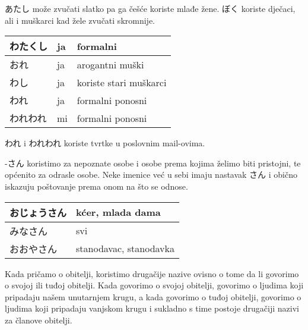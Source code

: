 	\vspace{10pt}
	
	あたし može zvučati slatko pa ga češće koriste mlađe žene. ぼく koriste dječaci, ali i muškarci kad žele zvučati skromnije.
	
	
	\vspace{10pt}
	
	\begin{tabular}{|l|l|l|}
		\hline
		わたくし&ja&formalni\\\hline
		おれ&ja&arogantni muški\\\hline
		わし&ja&koriste stari muškarci\\\hline
		われ&ja&formalni ponosni\\\hline
		われわれ&mi&formalni ponosni\\\hline
	\end{tabular}

	\vspace{10pt}	
	
	われ i われわれ koriste tvrtke u poslovnim mail-ovima.
	
	
	\ten {}

	\vspace{10pt}

	-さん	koristimo za nepoznate osobe i osobe prema kojima želimo biti pristojni, te općenito za odrasle osobe. Neke imenice već u sebi imaju nastavak さん i obično iskazuju poštovanje prema onom na što se odnose.
	
	
	\vspace{10pt}	
	
	\begin{tabular}{|l|l|}
		\hline
		おじょうさん&kćer, mlada dama\\\hline
		みなさん&svi\\\hline
		おおやさん&stanodavac, stanodavka\\\hline

	\end{tabular}
	
	\vspace{10pt}
	
	Kada pričamo o obitelji, koristimo drugačije nazive ovisno o tome da li govorimo o svojoj ili tuđoj obitelji. Kada govorimo o svojoj obitelji, govorimo o ljudima koji pripadaju našem unutarnjem krugu, a kada govorimo o tuđoj obitelji, govorimo o ljudima koji pripadaju vanjskom krugu i sukladno s time postoje drugačiji nazivi za članove obitelji.
	
